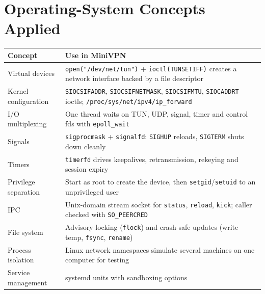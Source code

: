 \documentclass[12pt,a4paper]{article}
\begin{document}
\section{Operating-System Concepts Applied}
\begin{tabularx}{\textwidth}{@{}lX@{}}
\toprule
\textbf{Concept} & \textbf{Use in MiniVPN}\\
\midrule
Virtual devices & \texttt{open("/dev/net/tun")} + \texttt{ioctl(TUNSETIFF)} creates a network interface backed by a file descriptor\\
Kernel configuration & \texttt{SIOCSIFADDR}, \texttt{SIOCSIFNETMASK}, \texttt{SIOCSIFMTU}, \texttt{SIOCADDRT} ioctls; \texttt{/proc/sys/net/ipv4/ip\_forward}\\
I/O multiplexing & One thread waits on TUN, UDP, signal, timer and control fds with \texttt{epoll\_wait}\\
Signals & \texttt{sigprocmask} + \texttt{signalfd}: \texttt{SIGHUP} reloads, \texttt{SIGTERM} shuts down cleanly\\
Timers & \texttt{timerfd} drives keepalives, retransmission, rekeying and session expiry\\
Privilege separation & Start as root to create the device, then \texttt{setgid}/\texttt{setuid} to an unprivileged user\\
IPC & Unix-domain stream socket for \texttt{status}, \texttt{reload}, \texttt{kick}; caller checked with \texttt{SO\_PEERCRED}\\
File system & Advisory locking (\texttt{flock}) and crash-safe updates (write temp, \texttt{fsync}, \texttt{rename})\\
Process isolation & Linux network namespaces simulate several machines on one computer for testing\\
Service management & systemd units with sandboxing options\\
\bottomrule
\end{tabularx}
\end{document}
